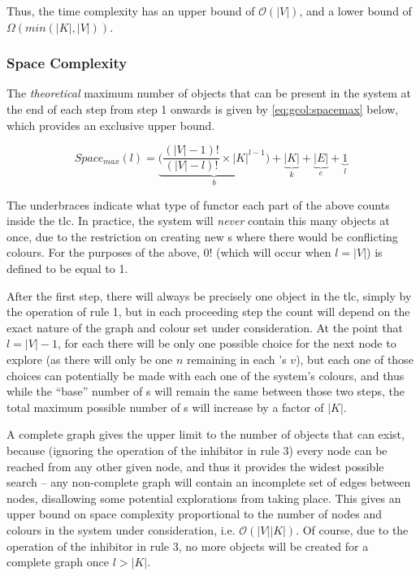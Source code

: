 Thus, the time complexity has an upper bound of \(\mathcal{O}(|V|)\), and a lower bound of \(\Omega(min(|K|, |V|))\).

\subsubsection{Space Complexity}

The \emph{theoretical} maximum number of objects that can be present in the system at the end of each step from step 1 onwards is given by \cref{eq:gcol:spacemax} below, which provides an exclusive upper bound.

\begin{equation}\label{eq:gcol:spacemax}
    Space_{max}(l) = \underbrace{\bigg(\frac{(|V| - 1)!}{(|V| - l)!} \times |K|^{l-1}\bigg)}_{b} + \underbrace{|K|}_{k} + \underbrace{|E|}_{e} + \underbrace{1}_{l}
\end{equation}

The underbraces indicate what type of functor each part of the above counts inside the \gls{tlc}.  In practice, the system will \emph{never} contain this many objects at once, due to the restriction on creating new \bo{}s where there would be conflicting colours.  For the purposes of the above, \(0!\) (which will occur when \(l = |V|\)) is defined to be equal to 1.

After the first step, there will always be precisely one \bo{} object in the \gls{tlc}, simply by the operation of rule 1, but in each proceeding step the count will depend on the exact nature of the graph and colour set under consideration.  At the point that \(l = |V| - 1\), for each \bo{} there will be only one possible choice for the next node to explore (as there will only be one \(n\) remaining in each \bo{}'s \(v\)), but each one of those choices can potentially be made with each one of the system's colours, and thus while the ``base'' number of \bo{}s will remain the same between those two steps, the total maximum possible number of \bo{}s will increase by a factor of \(|K|\).

A complete graph gives the upper limit to the number of objects that can exist, because (ignoring the operation of the inhibitor in rule 3) every node can be reached from any other given node, and thus it provides the widest possible search -- any non-complete graph will contain an incomplete set of edges between nodes, disallowing some potential explorations from taking place.  This gives an upper bound on space complexity proportional to the number of nodes and colours in the system under consideration, i.e. \(\mathcal{O}(|V||K|)\).  Of course, due to the operation of the inhibitor in rule 3, no more \bo{} objects will be created for a complete graph once \(l > |K|\).

